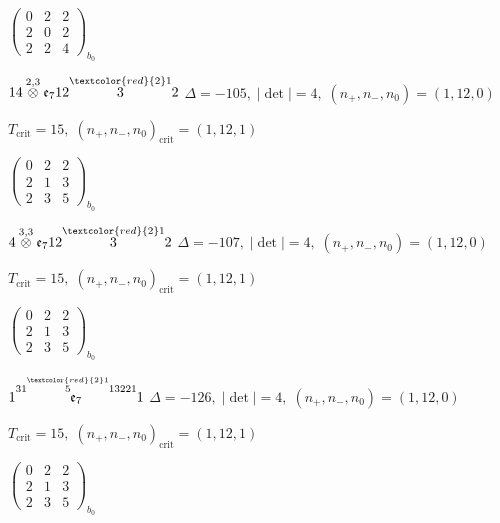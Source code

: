 \documentclass[10pt]{article}
\begin{document}
\hspace{2em}$\left(\begin{smallmatrix}0 & 2 & 2 \\ 2 & 0 & 2 \\ 2 & 2 & 4\end{smallmatrix}\right)_{\!b_0}$

\smallskip

$14\overset{2,3}{\otimes}\mathfrak{e}_712\overset{\textcolor{red}{2}1}{3}2$ \quad $\Delta=-105,\; |\det|=4,\; (n_+,n_-,n_0)=(1,12,0)$

\hspace{1em}$T_{\text{crit}}=15,\; (n_+,n_-,n_0)_{\text{crit}}=(1,12,1)$

\hspace{2em}$\left(\begin{smallmatrix}0 & 2 & 2 \\ 2 & 1 & 3 \\ 2 & 3 & 5\end{smallmatrix}\right)_{\!b_0}$

\smallskip

$4\overset{3,3}{\otimes}\mathfrak{e}_712\overset{\textcolor{red}{2}1}{3}2$ \quad $\Delta=-107,\; |\det|=4,\; (n_+,n_-,n_0)=(1,12,0)$

\hspace{1em}$T_{\text{crit}}=15,\; (n_+,n_-,n_0)_{\text{crit}}=(1,12,1)$

\hspace{2em}$\left(\begin{smallmatrix}0 & 2 & 2 \\ 2 & 1 & 3 \\ 2 & 3 & 5\end{smallmatrix}\right)_{\!b_0}$

\smallskip

$1\overset{31\overset{\textcolor{red}{2}1}{5}13221}{\mathfrak{e}_7}1$ \quad $\Delta=-126,\; |\det|=4,\; (n_+,n_-,n_0)=(1,12,0)$

\hspace{1em}$T_{\text{crit}}=15,\; (n_+,n_-,n_0)_{\text{crit}}=(1,12,1)$

\hspace{2em}$\left(\begin{smallmatrix}0 & 2 & 2 \\ 2 & 1 & 3 \\ 2 & 3 & 5\end{smallmatrix}\right)_{\!b_0}$
\end{document}
